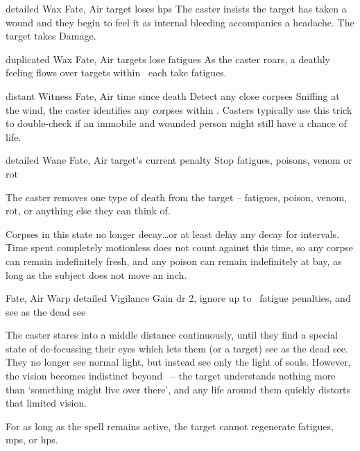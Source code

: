   {detailed}%
  {Wax}%
  {Fate, Air}%
  {}%
  {target loses  \glspl{hp}}%
  {
    The caster insists the target has taken a wound and they begin to feel it as internal bleeding accompanies a headache.
    The target takes  Damage.
  }

  {duplicated}%
  {Wax}%
  {Fate, Air}%
  {}%
  { targets lose  \glspl{fatigue}}%
  {
    As the caster roars, a deathly feeling flows over  targets within \spellRange\ each take  \glspl{fatigue}.
  }

  {distant}%
  {Witness}%
  {Fate, Air}%
  {time since death}%
  {Detect any close corpses}%
  {
    Sniffing at the wind, the caster identifies any corpses within \spellRange.
    Casters typically use this trick to double-check if an immobile and wounded person might still have a chance of life.
  }

  {detailed}%
  {Wane}%
  {Fate, Air}%
  {target's current  penalty}%
  {Stop \glspl{fatigue}, poisons, venom or rot}%
  {
    The caster removes one type of death from the target -- \glspl{fatigue}, poison, venom, rot, or anything else they can think of.

    Corpses in this state no longer decay\ldots or at least delay any decay for  \glspl{interval}. 
    Time spent completely motionless does not count against this time, so any corpse can remain indefinitely fresh, and any poison can remain indefinitely at bay, as long as the subject does not move an inch.
  }

  {Fate, Air}%
  {Warp}%
  {detailed}%
  {Vigilance}%
  {Gain \gls{dr} 2, ignore up to ~\gls{fatigue} penalties, and see as the dead see}%
  {
    The caster stares into a middle distance continuously, until they find a special state of de-focussing their eyes which lets them (or a target) see as the dead see.
    They no longer see normal light, but instead see only the light of souls.
    However, the vision becomes indistinct beyond \spellRange\ -- the target understands nothing more than `something might live over there', and any life around them quickly distorts that limited vision.

    For as long as the spell remains active, the target cannot regenerate \glspl{fatigue}, \glspl{mp}, or \glspl{hp}.
  }

